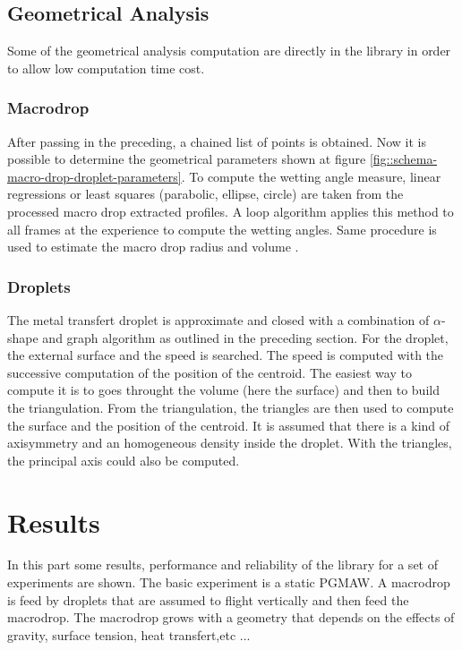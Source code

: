 \documentclass[12pt]{iopart}
\begin{document}
\subsection{Geometrical Analysis}
\label{geometrical_analize}
Some of the geometrical analysis computation are directly in the
library in order to allow low computation time cost.

\subsubsection{Macrodrop}
\label{macrodrop}

After passing in the preceding, a chained list of points is obtained.
Now it is possible to determine the geometrical parameters shown 
at figure \ref{fig::schema-macro-drop-droplet-parameters}. To compute the wetting 
angle measure, linear regressions or least squares (parabolic, ellipse, circle) 
are taken from the processed macro drop extracted profiles.
A loop algorithm applies this method to all frames at the experience to compute the wetting 
angles. Same procedure is used to estimate the macro drop radius and volume \cite{CHAPUIS}.

\subsubsection{Droplets}
\label{droplets}

The metal transfert droplet is approximate and closed with a combination of $\alpha$-shape and
graph algorithm as outlined in the preceding section.
For the droplet, the external surface and the speed is searched.
The speed is computed with the successive computation of the position of the centroid.
The easiest way to compute it is to goes throught the volume (here the surface) and then
to build the triangulation. From the triangulation, the triangles 
are then used to compute the surface and the position of the centroid. It is assumed that there is a kind
of axisymmetry  and an homogeneous density inside the droplet. With the triangles, the principal axis could also be 
computed.


\section{ Results}
\label{results}

In this part some results, performance and reliability of the library for a set of experiments
are shown. The basic experiment is a static PGMAW.
A macrodrop is feed by droplets that are assumed to flight vertically and
then feed the macrodrop. The macrodrop grows with a geometry that depends on the effects of gravity,
surface tension, heat transfert,etc ...
\end{document}
